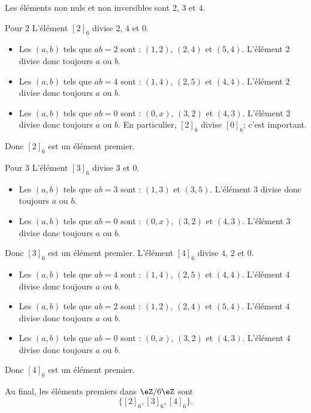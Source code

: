\begin{normaltext}       \label{NORMooAXOKooAQMXoB}
    Les éléments non nuls et non inversibles sont \( 2\), \( 3\) et \( 4\).
    \begin{subproof}
    \item[Pour \( 2\)]
        L'élément \( [2]_6\) divise \( 2\), \( 4\) et \( 0\).
        \begin{itemize}
            \item Les \( (a,b)\) tels que \( ab=2\) sont : $(1,2)$, \( (2,4)\) et \( (5,4)\). L'élément \( 2\) divise donc toujours \( a\) ou \( b\).
            \item Les \( (a,b)\) tels que \( ab=4\) sont : $(1,4)$, \( (2,5)\) et \( (4,4)\). L'élément \( 2\) divise donc toujours \( a\) ou \( b\).
            \item Les \( (a,b)\) tels que \( ab=0\) sont : \( (0,x)\),  $(3,2)$ et \( (4,3)\). L'élément \( 2\) divise donc toujours \( a\) ou \( b\). En particulier, \( [2]_6\) divise \( [0]_6\); c'est important.
        \end{itemize}
        Donc \( [2]_6\) est un élément premier.
    \item[Pour \( 3\)]
        L'élément \( [3]_6\) divise \( 3\) et \( 0\).
        \begin{itemize}
            \item Les \( (a,b)\) tels que \( ab=3\) sont : $(1,3)$ et \( (3,5)\). L'élément \( 3\) divise donc toujours \( a\) ou \( b\).
            \item Les \( (a,b)\) tels que \( ab=0\) sont : \( (0,x)\),  $(3,2)$ et \( (4,3)\). L'élément \( 3\) divise donc toujours \( a\) ou \( b\).
        \end{itemize}
        Donc \( [3]_6\) est un élément premier.
        L'élément \( [4]_6\) divise \( 4\), \( 2\) et \( 0\).
        \begin{itemize}
            \item Les \( (a,b)\) tels que \( ab=4\) sont : $(1,4)$, \( (2,5)\) et \( (4,4)\). L'élément \( 4\) divise donc toujours \( a\) ou \( b\).
            \item Les \( (a,b)\) tels que \( ab=2\) sont : $(1,2)$, \( (2,4)\) et \( (5,4)\). L'élément \( 4\) divise donc toujours \( a\) ou \( b\).
            \item Les \( (a,b)\) tels que \( ab=0\) sont : \( (0,x)\),  $(3,2)$ et \( (4,3)\). L'élément \( 4\) divise donc toujours \( a\) ou \( b\).
        \end{itemize}
        Donc \( [4]_6\) est un élément premier.
    \end{subproof}
    Au final, les éléments premiers dans \( \eZ/6\eZ\) sont 
    \begin{equation}
        \big\{ [2]_6, [3]_6, [4]_6  \big\}.
    \end{equation}
\end{normaltext}

